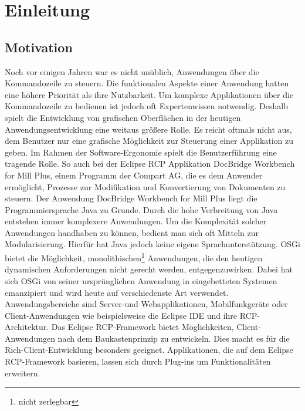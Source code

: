 
\chapter{Einleitung}
\label{cha:Einleitung}

\section{Motivation}{
Noch vor einigen Jahren war es nicht unüblich, Anwendungen über die Kommandozeile zu steuern. Die funktionalen Aspekte einer Anwendung hatten eine höhere Priorität als ihre Nutzbarkeit. Um komplexe Applikationen über die Kommandozeile zu bedienen ist jedoch oft Expertenwissen notwendig. Deshalb spielt die Entwicklung von grafischen Oberflächen in der heutigen Anwendungsentwicklung eine weitaus größere Rolle. Es reicht oftmals nicht aus, dem Benutzer nur eine grafische Möglichkeit zur Steuerung einer Applikation zu geben. Im Rahmen der Software-Ergonomie spielt die Benutzerführung eine tragende Rolle. So auch bei der Eclipse \ac {RCP} Applikation DocBridge\textsuperscript{\textregistered} Workbench for Mill Plus, einem Programm der Compart AG, die es dem Anwender ermöglicht, Prozesse zur Modifikation und Konvertierung von Dokumenten zu steuern. Der Anwendung DocBridge\textsuperscript{\textregistered} Workbench for Mill Plus liegt die Programmiersprache Java zu Grunde. Durch die hohe Verbreitung von Java entstehen immer komplexere Anwendungen. Um die Komplexität solcher Anwendungen handhaben zu können, bedient man sich oft Mitteln zur Modularisierung. Hierfür hat Java jedoch keine eigene Sprachunterstützung. \ac{OSGi} bietet die Möglichkeit, monolithischen\footnote{nicht zerlegbar} Anwendungen, die den heutigen dynamischen Anforderungen nicht gerecht werden, entgegenzuwirken. Dabei hat sich \ac{OSGi} von seiner ursprünglichen Anwendung in eingebetteten Systemen emanzipiert und wird heute auf verschiedenste Art verwendet. Anwendungsbereiche sind Server-und Webapplikationen, Mobilfunkgeräte oder Client-Anwendungen wie beispielsweise die Eclipse \ac{IDE} und ihre \ac{RCP}-Architektur. Das Eclipse \ac {RCP}-Framework bietet Möglichkeiten, Client-Anwendungen nach dem Baukastenprinzip zu entwickeln. Dies macht es für die Rich-Client-Entwicklung besonders geeignet. Applikationen, die auf dem Eclipse \ac{RCP}-Framework basieren, lassen sich durch Plug-ins um Funktionalitäten erweitern.
}
